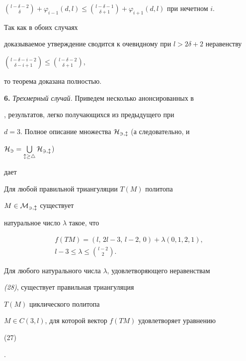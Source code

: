 $\binom{l-\delta -2}{\delta}+\varphi_{i-1}(d,l) \le


\binom{l-\delta-1}{\delta+1}+\varphi_{i+1}(d,l)$ при нечетном $i$.


Так как в обоих случаях


доказываемое утверждение сводится к очевидному при $l>2\delta+2$ неравенству


$\binom{l-\delta -i-2}{\delta -i+1} \le \binom{l-\delta -2}{\delta +1}$,


то теорема доказана полностью.


\medskip





{\bf 6.} {\it Трехмерный случай.} Приведем несколько анонсированных в


\cite{S2}, \cite{S3} результатов, легко получающихся из предыдущего при


$d=3$. Полное описание множества $\cal H_{3,l}$ (а следовательно, и


$\cal H_3=\bigcup\limits_{l\ge 4}\cal H_{3,l}$)


дает





\begin{thm}


Для любой правильной триангуляции $T(M)$ политопа


$M\in\cal M_{3,l}$ существует


натуральное число $\lambda$ такое, что


\begin{gather}


f(TM)=(l,\,2l-3,\,l-2,\,0)+\lambda(0,1,2,1),\\


l-3\le\lambda\le\binom{l-2}{2}.


\end{gather}


Для любого натурального числа $\lambda$, удовлетворяющего неравенствам


{\em (28)}, существует правильная триангуляция


$T(M)$ циклического политопа


$M\in C(3,l)$, для которой вектор $f(TM)$ удовлетворяет уравнению {\em


(27)}.


\end{thm}





